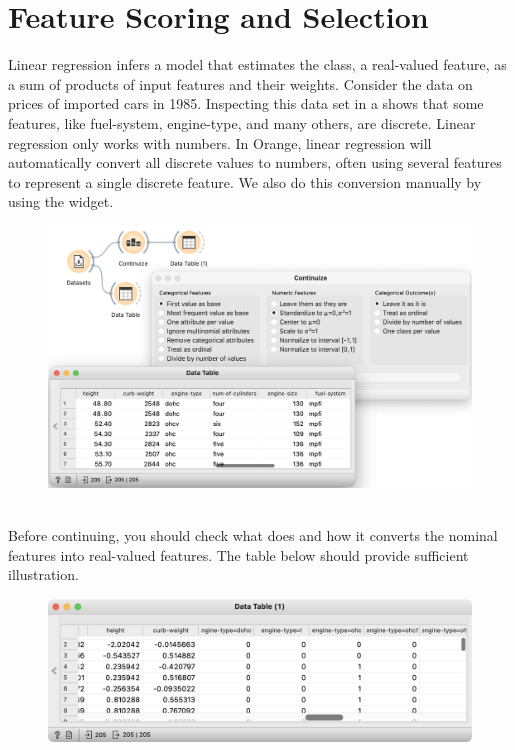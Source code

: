 \chapter{Feature Scoring and Selection}
\label{ch:reg-fss}

Linear regression infers a model that estimates the class, a real-valued feature, as a sum of products of input features and their weights. Consider the data on prices of imported cars in 1985. Inspecting this data set in a  shows that some features, like fuel-system, engine-type, and many others, are discrete. Linear regression only works with numbers. In Orange, linear regression will automatically convert all discrete values to numbers, often using several features to represent a single discrete feature. We also do this conversion manually by using the  widget.

\begin{figure}[h]
    \centering
    \includegraphics[scale=0.5]{workflow-continuize.png}
    \caption{$\;$}
\end{figure}

Before continuing, you should check what  does and how it converts the nominal features into real-valued features. The table below should provide sufficient illustration.

\begin{figure}[h]
    \centering
    \includegraphics[scale=0.5]{after-continuize.png}
    \caption{$\;$}
\end{figure}


